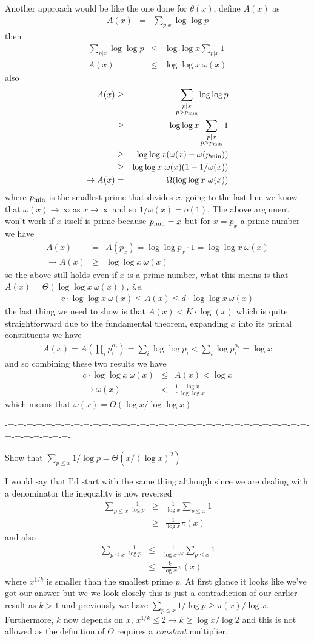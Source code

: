 \documentclass[aps,preprint,preprintnumbers,nofootinbib,showpacs,prd]{revtex4-1}
\newcommand{\ie}{{\it i.e.} }
\newcommand{\nbea}{\begin{eqnarray*}}
\newcommand{\neea}{\end{eqnarray*}}
\begin{document}
Another approach would be like the one done for $\theta(x)$, define $A(x)$ as 
%
\nbea
A(x) & = & \sum_{p|x} \log \log p
\neea
%
then
%
\nbea
\sum_{p|x} \log \log p & \le & \log \log x \sum_{p|x} 1 \\
A(x) & \le & \log \log x ~ \omega(x)
\neea
%
also
%
\nbea
A(x) & \ge & \sum_{\substack{p|x\\p > p_{\rm min}}} \log \log p \\
& \ge & \log \log x \sum_{\substack{p|x\\p > p_{\rm min}}} 1 \\
& \ge & \log \log x (\omega(x) - \omega(p_{\rm min})) \\
& \ge & \log \log x ~ \omega(x) (1 - 1/\omega(x)) \\
\to A(x) & = & \Omega(\log \log x ~ \omega(x))
\neea
%
where $p_{\rm min}$ is the smallest prime that divides $x$, going to the last line we know that $\omega(x) \to \infty$ as $x \to \infty$ and so $1/\omega(x) = o(1)$. The above argument won't work if $x$ itself is prime because $p_{\rm min} = x$ but for $x = p_x$ a prime number we have
%
\nbea
A(x) & = & A(p_x) = \log \log p_x \cdot 1 = \log \log x ~ \omega(x) \\
\to A(x) & \ge & \log \log x ~ \omega(x)
\neea
%
so the above still holds even if $x$ is a prime number, what this means is that $A(x) = \Theta(\log \log x ~ \omega(x))$, \ie
%
\nbea
c\cdot \log \log x ~ \omega(x) \le A(x) \le d \cdot \log \log x ~ \omega(x)
\neea
%
the last thing we need to show is that $A(x) < K \cdot \log(x)$ which is quite straightforward due to the fundamental theorem, expanding $x$ into its primal constituents we have
%
\nbea
A(x) = A \left ( \prod_i p_i^{\alpha_i} \right ) = \sum_i \log \log p_i < \sum_i \log p_i^{\alpha_i} = \log x
\neea
%
and so combining these two results we have
%
\nbea
c\cdot \log \log x ~ \omega(x) & \le & A(x) < \log x \\
\to \omega(x) & < & \frac{1}{c} \frac{\log x}{\log \log x}
\neea
%
which means that $\omega(x) = O(\log x/\log \log x)$

-=-=-=-=-=-=-=-=-=-=-=-=-=-=-=-=-=-=-=-=-=-=-=-=-=-=-=-=-=-=-=-=-=-=-=-=-=-=-=-

Show that $\sum_{p \le x} 1 / \log p = \Theta(x/(\log x)^2)$

I would say that I'd start with the same thing although since we are dealing with a denominator the inequality is now reversed
%
\nbea
\sum_{p \le x} \frac{1} {\log p} & \ge & \frac{1}{\log x} \sum_{p \le x} 1 \\
& \ge & \frac{1}{\log x} \pi(x)
\neea
%
and also
%
\nbea
\sum_{p \le x} \frac{1} {\log p} & \le & \frac{1} {\log x^{1/k}}\sum_{p \le x} 1 \\
& \le & \frac{k}{\log x} \pi(x)
\neea
%
where $x^{1/k}$ is smaller than the smallest prime $p$. At first glance it looks like we've got our answer but we we look closely this is just a contradiction of our earlier result as $k > 1$ and previously we have $\sum_{p \le x} 1/\log p \ge \pi(x)/\log x$. Furthermore, $k$ now depends on $x$, $x^{1/k} \le 2 \to  k \ge \log x/\log 2$ and this is not allowed as the definition of $\Theta$ requires a {\it constant} multiplier.
\end{document}
